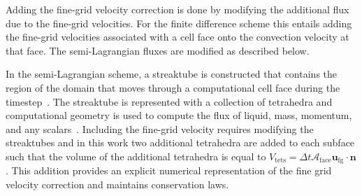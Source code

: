 Adding the fine-grid velocity correction is done by modifying the additional flux due to the fine-grid velocities.  For the finite difference scheme this entails adding the fine-grid velocities associated with a cell face onto the convection velocity at that face.  The semi-Lagrangian fluxes are modified as described below.

In the semi-Lagrangian scheme, a streaktube is constructed that contains the region of the domain that moves through a computational cell face during the timestep~\cite{Owkes2017}.  The streaktube is represented with a collection of tetrahedra and computational geometry is used to compute the flux of liquid, mass, momentum, and any scalars~\cite{Owkes2017}. Including the fine-grid velocity requires modifying the streaktubes and in this work two additional tetrahedra are added to each subface such that the volume of the additional tetrahedra is equal to $V_\text{tets}=\Delta t \mathcal{A}_\text{face} \bm{u}_\text{fg}\cdot\bm{n}$. This addition provides an explicit numerical representation of the fine grid velocity correction and maintains conservation laws. 



















